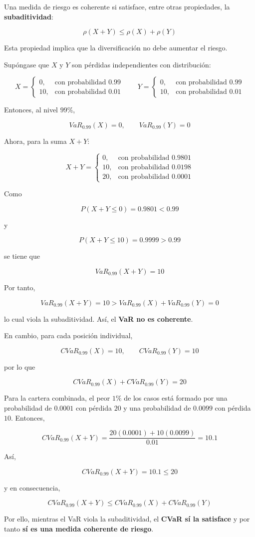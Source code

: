 
Una medida de riesgo es coherente si satisface, entre otras propiedades, la \textbf{subaditividad}:

\[
\rho(X+Y)\leq \rho(X)+\rho(Y)
\]

Esta propiedad implica que la diversificación no debe aumentar el riesgo.

Supóngase que \(X\) y \(Y\) son pérdidas independientes con distribución:

\[
X=
\begin{cases}
0, & \text{con probabilidad } 0.99 \\
10, & \text{con probabilidad } 0.01
\end{cases}
\qquad
Y=
\begin{cases}
0, & \text{con probabilidad } 0.99 \\
10, & \text{con probabilidad } 0.01
\end{cases}
\]

Entonces, al nivel \(99\%\),

\[
VaR_{0.99}(X)=0, \qquad VaR_{0.99}(Y)=0
\]

Ahora, para la suma \(X+Y\):

\[
X+Y=
\begin{cases}
0, & \text{con probabilidad } 0.9801 \\
10, & \text{con probabilidad } 0.0198 \\
20, & \text{con probabilidad } 0.0001
\end{cases}
\]

Como

\[
P(X+Y\leq 0)=0.9801<0.99
\]

y

\[
P(X+Y\leq 10)=0.9999>0.99
\]

se tiene que

\[
VaR_{0.99}(X+Y)=10
\]

Por tanto,

\[
VaR_{0.99}(X+Y)=10 > VaR_{0.99}(X)+VaR_{0.99}(Y)=0
\]

lo cual viola la subaditividad. Así, el \textbf{VaR no es coherente}.

En cambio, para cada posición individual,

\[
CVaR_{0.99}(X)=10, \qquad CVaR_{0.99}(Y)=10
\]

por lo que

\[
CVaR_{0.99}(X)+CVaR_{0.99}(Y)=20
\]

Para la cartera combinada, el peor \(1\%\) de los casos está formado por una probabilidad de \(0.0001\) con pérdida \(20\) y una probabilidad de \(0.0099\) con pérdida \(10\). Entonces,

\[
CVaR_{0.99}(X+Y)=\frac{20(0.0001)+10(0.0099)}{0.01}=10.1
\]

Así,

\[
CVaR_{0.99}(X+Y)=10.1 \leq 20
\]

y en consecuencia,

\[
CVaR_{0.99}(X+Y)\leq CVaR_{0.99}(X)+CVaR_{0.99}(Y)
\]

Por ello, mientras el VaR viola la subaditividad, el \textbf{CVaR sí la satisface} y por tanto \textbf{sí es una medida coherente de riesgo}.